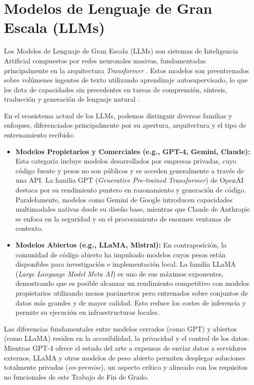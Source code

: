 \section{Modelos de Lenguaje de Gran Escala (LLMs)}

Los Modelos de Lenguaje de Gran Escala (LLMs) son sistemas de Inteligencia Artificial compuestos por redes neuronales masivas, fundamentadas principalmente en la arquitectura \textit{Transformer} \cite{vaswani2017attention}. Estos modelos son preentrenados sobre volúmenes ingentes de texto utilizando aprendizaje autosupervisado, lo que les dota de capacidades sin precedentes en tareas de comprensión, síntesis, traducción y generación de lenguaje natural \cite{zhao2023survey}.

En el ecosistema actual de los LLMs, podemos distinguir diversas familias y enfoques, diferenciados principalmente por su apertura, arquitectura y el tipo de entrenamiento recibido:

\begin{itemize}
    \item \textbf{Modelos Propietarios y Comerciales (e.g., GPT-4, Gemini, Claude):} Esta categoría incluye modelos desarrollados por empresas privadas, cuyo código fuente y pesos no son públicos y se acceden generalmente a través de una API. La familia GPT (\textit{Generative Pre-trained Transformer}) de OpenAI \cite{openai2023gpt4} destaca por su rendimiento puntero en razonamiento y generación de código. Paralelamente, modelos como Gemini de Google \cite{geminoteam2023gemini} introducen capacidades multimodales nativas desde su diseño base, mientras que Claude de Anthropic \cite{anthropic2023claude} se enfoca en la seguridad y en el procesamiento de enormes ventanas de contexto.
    \item \textbf{Modelos Abiertos (e.g., LLaMA, Mistral):} En contraposición, la comunidad de código abierto ha impulsado modelos cuyos pesos están disponibles para investigación e implementación local. La familia LLaMA (\textit{Large Language Model Meta AI}) \cite{touvron2023llama} es uno de sus máximos exponentes, demostrando que es posible alcanzar un rendimiento competitivo con modelos propietarios utilizando menos parámetros pero entrenados sobre conjuntos de datos más grandes y de mayor calidad. Esto reduce los costes de inferencia y permite su ejecución en infraestructuras locales.
\end{itemize}

Las diferencias fundamentales entre modelos cerrados (como GPT) y abiertos (como LLaMA) residen en la accesibilidad, la privacidad y el control de los datos. Mientras GPT-4 ofrece el estado del arte a expensas de enviar datos a servidores externos, LLaMA y otros modelos de peso abierto permiten desplegar soluciones totalmente privadas (\textit{on-premise}), un aspecto crítico y alineado con los requisitos no funcionales de este Trabajo de Fin de Grado.

